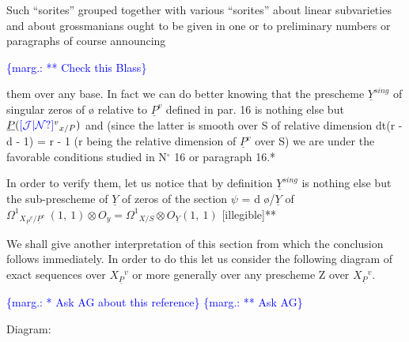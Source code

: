 \documentclass[11pt]{article}
\newcommand{\scanpage}[1]{\par\bigskip\noindent{\small\sffamily[scan #1]}\par}
\newcommand{\mspage}[1]{{\small\sffamily[p.\,#1]}}
\newcommand{\hand}[1]{\textcolor{blue}{#1}}
\newcommand{\margin}[1]{\textcolor{blue}{\{\textsf{marg.:} #1\}}}
\newcommand{\unsure}[1]{[#1?]}
\begin{document}
Such ``sorites'' grouped together with various ``sorites'' about
linear subvarieties and about grossmanians ought to be given in
one or to preliminary numbers or paragraphs of course announcing

\margin{** Check this Blass}

\clearpage
\scanpage{24/45}
\mspage{45}

them over any base.  In fact we can do better knowing that the
prescheme $\underline{Y}^{sing}$ of singular zeros of \o{} relative to $\underline{P}^{v}$ defined in
par. 16 is nothing else but $\underline{P}(\hand{\unsure{\mathcal{J}|\mathcal{N}}}{}^{v}{}_{x/P})$ and (since the latter is
smooth over S of relative dimension dt(r - d - 1) = r - 1 (r being
the relative dimension of $\underline{P}^{v}$ over S) we are under the favorable
conditions studied in N$^\circ$ 16 or paragraph 16.*

In order to verify them, let us notice that by definition
$\underline{Y}^{sing}$ is nothing else but the sub-prescheme of $\underline{Y}$ of zeros of the
section $\psi$ = d \o/$\underline{Y}$ of $\Omega^{1}{}_{X_{\underline{P}}{}^{v}/\underline{P}^{v}}\ (1,\ 1) \otimes O_{y} = \Omega^{1}{}_{X/S} \otimes O_{\underline{Y}}(1,\ 1)$
[illegible]**

We shall give another interpretation of this section from
which the conclusion follows immediately.  In order to do this let
us consider the following diagram of exact sequences over $X_{\underline{P}}{}^{v}$ or
more generally over any prescheme Z over $X_{\underline{P}}{}^{v}$.


\margin{* Ask AG about this reference}
\margin{** Ask AG}

\clearpage
\scanpage{24/46}
\mspage{46}

Diagram:
\end{document}
